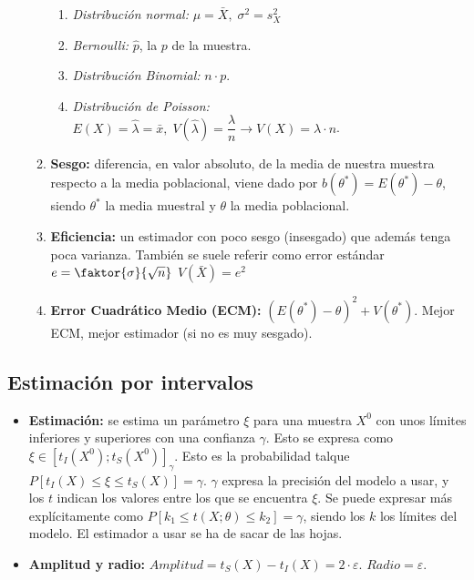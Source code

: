 \documentclass[a4paper, twocolumn, 10pt]{article}
\begin{document}
\begin{itemize}
\begin{enumerate}
		\begin{enumerate}
			\item \textit{Distribución normal:} $\mu = \bar{X}, \; \sigma^2 = s_X^2$
			\item \textit{Bernoulli:} $\hat{p}$, la $p$ de la muestra. 
			\item \textit{Distribución Binomial:} $n\cdot p$. 
			\item \textit{Distribución de Poisson:} $E(X) = \hat{\lambda} = \bar{x}, \; V(\hat{\lambda}) = \dfrac{\lambda}{n} \rightarrow V(X) = \lambda\cdot n$.
		\end{enumerate}
		\item \textbf{Sesgo:} diferencia, en valor absoluto, de la media de nuestra muestra respecto a la media poblacional, viene dado por $b(\theta^\ast) = E(\theta^\ast) - \theta$, siendo $\theta^\ast$ la media muestral y $\theta$ la media poblacional.
		\item \textbf{Eficiencia:} un estimador con poco sesgo (insesgado) que además tenga poca varianza. También se suele referir como error estándar $ e= \faktor{\sigma}{\sqrt{n}}$ $V(\bar{X}) = e^2$
		\item \textbf{Error Cuadrático Medio (ECM):} $\left(E(\theta^\ast)-\theta\right)^2 + V(\theta^\ast).$ Mejor ECM, mejor estimador (si no es muy sesgado).
	\end{enumerate}
\end{itemize}

\subsection{Estimación por intervalos}

\begin{itemize}
	\item \textbf{Estimación:} se estima un parámetro $\xi$ para una muestra $X^0$ con unos límites inferiores y superiores con una confianza $\gamma$. Esto se expresa como $\xi \in \left[t_I(X^0); t_S(X^0)\right]_\gamma$. Esto es la probabilidad talque $P\left[t_I(X)\leq \xi \leq t_S(X)\right] = \gamma$. $\gamma$ expresa la precisión del modelo a usar, y los $t$ indican los valores entre los que se encuentra $\xi$. Se puede expresar más explícitamente como $P\left[k_1\leq t(X;\theta)\leq k_2\right] = \gamma$, siendo los $k$ los límites del modelo. El estimador a usar se ha de sacar de las hojas.
	\item \textbf{Amplitud y radio:} $Amplitud = t_S(X) -t_I(X) = 2\cdot \varepsilon$. $Radio = \varepsilon$.
\end{itemize}
\end{document}
